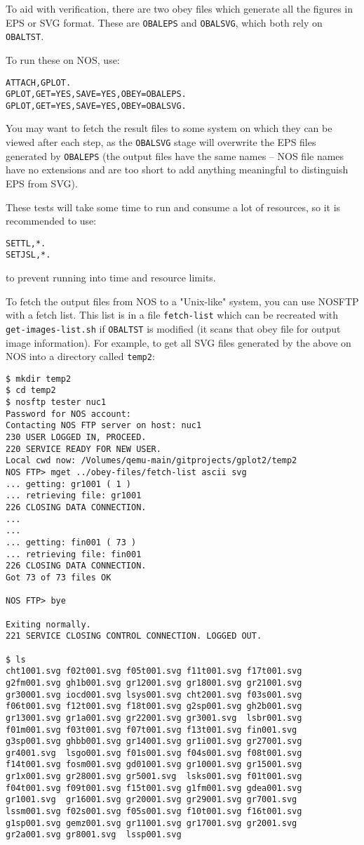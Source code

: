 \documentclass[a4paper,twoside,11pt]{article}
\newcommand{\newpara}{\par\vspace{4mm}\noindent}
\begin{document}
\newpara
To aid with verification, there are two obey files which generate all the figures
in EPS or SVG format. These are \texttt{OBALEPS} and \texttt{OBALSVG},
which both rely on \texttt{OBALTST}.

\newpara
To run these on NOS, use:
\begin{lstlisting}
ATTACH,GPLOT.
GPLOT,GET=YES,SAVE=YES,OBEY=OBALEPS.
GPLOT,GET=YES,SAVE=YES,OBEY=OBALSVG.
\end{lstlisting}

\newpara
You may want to fetch the result files to some system on which they can be
viewed after each step, as the \texttt{OBALSVG} stage will overwrite the EPS files
generated by \texttt{OBALEPS} (the output files have the same names -- NOS file names
have no extensions and are too short to add anything meaningful to distinguish 
EPS from SVG).

\newpara
These tests will take some time to run and consume a lot of resources, so
it is recommended to use:
\begin{lstlisting}
SETTL,*.
SETJSL,*.
\end{lstlisting}
to prevent running into time and resource limits.

\newpara
To fetch the output files from NOS to a "Unix-like" system, you can use NOSFTP
with a fetch list. This list is in a file \texttt{fetch-list} which can be recreated
with \texttt{get-images-list.sh} if \texttt{OBALTST} is modified (it scans that obey file for
output image information). For example, to get all SVG files generated by the above
on NOS into a directory called \texttt{temp2}:
\begin{lstlisting}
$ mkdir temp2
$ cd temp2
$ nosftp tester nuc1
Password for NOS account: 
Contacting NOS FTP server on host: nuc1
230 USER LOGGED IN, PROCEED.
220 SERVICE READY FOR NEW USER.
Local cwd now: /Volumes/qemu-main/gitprojects/gplot2/temp2
NOS FTP> mget ../obey-files/fetch-list ascii svg
... getting: gr1001 ( 1 )
... retrieving file: gr1001
226 CLOSING DATA CONNECTION.
...
...
... getting: fin001 ( 73 )
... retrieving file: fin001
226 CLOSING DATA CONNECTION.
Got 73 of 73 files OK

NOS FTP> bye

Exiting normally.
221 SERVICE CLOSING CONTROL CONNECTION. LOGGED OUT.

$ ls
cht1001.svg f02t001.svg f05t001.svg f11t001.svg f17t001.svg	
g2fm001.svg gh1b001.svg gr12001.svg gr18001.svg gr21001.svg	
gr30001.svg iocd001.svg lsys001.svg cht2001.svg f03s001.svg	
f06t001.svg f12t001.svg f18t001.svg g2sp001.svg gh2b001.svg	
gr13001.svg gr1a001.svg gr22001.svg gr3001.svg  lsbr001.svg
f01m001.svg f03t001.svg f07t001.svg f13t001.svg fin001.svg	
g3sp001.svg ghbb001.svg gr14001.svg gr1i001.svg gr27001.svg	
gr4001.svg  lsgo001.svg f01s001.svg f04s001.svg f08t001.svg	
f14t001.svg fosm001.svg gd01001.svg gr10001.svg gr15001.svg	
gr1x001.svg gr28001.svg gr5001.svg  lsks001.svg f01t001.svg	
f04t001.svg f09t001.svg f15t001.svg g1fm001.svg gdea001.svg	
gr1001.svg  gr16001.svg gr20001.svg gr29001.svg gr7001.svg	
lssm001.svg f02s001.svg f05s001.svg f10t001.svg f16t001.svg	
g1sp001.svg gemz001.svg gr11001.svg gr17001.svg gr2001.svg	
gr2a001.svg gr8001.svg  lssp001.svg
\end{lstlisting}
\end{document}
